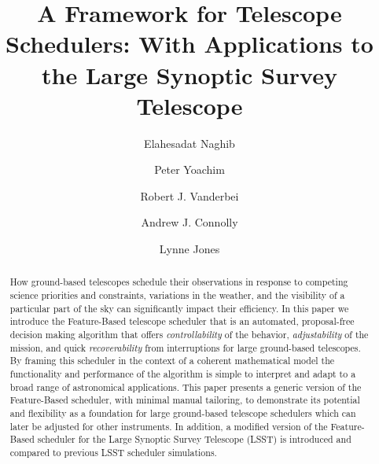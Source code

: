 \documentclass[12pt]{aastex62}
\theoremstyle{definition}
\begin{document}
\title{A Framework for Telescope Schedulers: With Applications to the Large Synoptic Survey Telescope}

\author{Elahesadat Naghib}

\author{Peter Yoachim} 

\author{Robert J. Vanderbei} 

\author{Andrew J. Connolly} 

\author{Lynne Jones}



\begin{abstract}
How ground-based telescopes schedule their observations in response to competing science priorities and constraints, variations in the weather, and the visibility of a particular part of the sky can significantly impact their efficiency. In this paper we introduce the Feature-Based telescope scheduler that is an automated, proposal-free decision making algorithm that offers \textit{controllability} of the behavior, \textit{adjustability} of the mission, and quick \textit{recoverability} from interruptions for large ground-based telescopes. By framing this scheduler in the context of a coherent mathematical model the functionality and performance of the algorithm is simple to interpret and adapt to a broad range of astronomical applications. This paper presents a generic version of the Feature-Based scheduler, with minimal manual tailoring, to demonstrate its potential and flexibility as a foundation for large ground-based telescope schedulers which can later be adjusted for other instruments. In addition, a modified version of the Feature-Based scheduler for the Large Synoptic Survey Telescope (LSST) is introduced and compared to previous LSST scheduler simulations.
\end{abstract}

\end{document}
